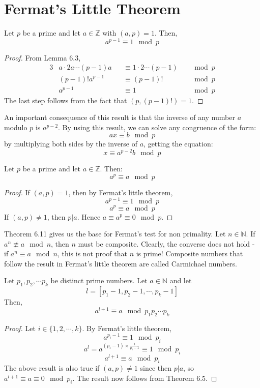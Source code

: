 \documentclass[12pt,letterpaper]{book}
\theoremstyle{definition}
\newcommand{\N}{\mathbb{N}}
\newcommand{\Z}{\mathbb{Z}}
\begin{document}
\section{Fermat's Little Theorem}

\phantom{}

\begin{theorem}
  Let $p$ be a prime and let $a \in \Z$ with $(a,p) = 1$. Then,
  \[a^{p-1} \equiv 1 \mod p\]
\end{theorem}
\begin{proof}
  From Lemma 6.3,
\begin{alignat*}{3}
  & a \cdot 2a \cdots (p-1)a && \equiv 1 \cdot 2 \cdots (p-1) && \mod p \\
  &(p-1)! a^{p-1} && \equiv (p-1)! &&\mod p \\
  & a^{p-1} && \equiv 1 &&\mod p
\end{alignat*}
The last step follows from the fact that $(p,(p-1)!) = 1$.
\end{proof}

An important consequence of this result is that the inverse of any number $a$ modulo $p$ is $a^{p-2}$. By using this result, we can solve any congruence of the form:
\[ax \equiv b \mod p\]
by multiplying both sides by the inverse of $a$, getting the equation:
\[x \equiv a^{p-2} b \mod p\]

\begin{theorem}
  Let $p$ be a prime and let $a \in \Z$. Then:
  \[a^p \equiv a \mod p\]
\end{theorem}
\begin{proof}
  If $(a,p) = 1$, then by Fermat's little theorem,
  \[a^{p-1} \equiv 1 \mod p\]
  \[a^p \equiv a \mod p\]
  If $(a,p) \neq 1$, then $p|a$. Hence $a \equiv a^p \equiv 0 \mod p$.
\end{proof}

Theorem 6.11 gives us the base for Fermat's test for non primality. Let $n \in \N$. If $a^n \not \equiv a \mod n$, then $n$ must be composite. Clearly, the converse does not hold - if $a^n \equiv a \mod n$, this is not proof that $n$ is prime! Composite numbers that follow the result in Fermat's little theorem are called Carmichael numbers.

\begin{theorem}
  Let $p_1, p_2, \cdots p_k$ be distinct prime numbers. Let $a \in \N$ and let
  \[l = [p_1-1,p_2-1, \cdots, p_k-1]\]
  Then,
  \[a^{l+1} \equiv a \mod p_1p_2 \cdots p_k\]
\end{theorem}
\begin{proof}
  Let $i \in \{1,2,\cdots, k\}$. By Fermat's little theorem,
  \[a^{p_i-1} \equiv 1 \mod p_i\]
  \[a^l = a^{(p_i-1) \times \frac{l}{p_i-1}} \equiv 1 \mod p_i\]
  \[a^{l+1} \equiv a \mod p_i\]
  The above result is also true if $(a,p) \neq 1$ since then $p|a$, so $a^{l+1} \equiv a \equiv 0 \mod p_i$. The result now follows from Theorem 6.5.
\end{proof}
\end{document}
